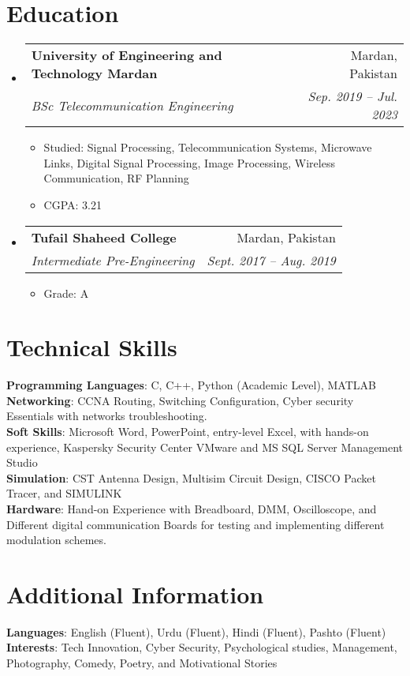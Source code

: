 \documentclass[letterpaper,11pt]{article}
\makeatletter
\newcommand{\resumeItem}[1]{
  \item\small{
    {#1 \vspace{-2pt}}
  }
}
\newcommand{\resumeSubheading}[4]{
  \vspace{-0.5pt}\item
    \begin{tabular*}{0.97\textwidth}[t]{l@{\extracolsep{\fill}}r}
      \textbf{#1} & #2 \\
      \textit{#3} & \textit{\small #4} \\
    \end{tabular*}\vspace{-7pt}
}
\newcommand{\resumeSubHeadingListStart}{\begin{itemize}[leftmargin=0.15in, label={}]}
\newcommand{\resumeSubHeadingListEnd}{\end{itemize}}
\newcommand{\resumeItemListStart}{\begin{itemize}}
\newcommand{\resumeItemListEnd}{\end{itemize}\vspace{-7pt}}
\makeatother
\begin{document}
\section{Education}
  \resumeSubHeadingListStart
    \resumeSubheading
      {University of Engineering and Technology Mardan}{Mardan, Pakistan}
      {BSc Telecommunication Engineering}{Sep. 2019 -- Jul. 2023}
      \resumeItemListStart
        \resumeItem{Studied: Signal Processing, Telecommunication Systems, Microwave Links, Digital Signal Processing, Image Processing, Wireless Communication, RF Planning}
        \resumeItem{CGPA: 3.21}
      \resumeItemListEnd
    \resumeSubHeadingListEnd

  \resumeSubHeadingListStart
    \resumeSubheading
      {Tufail Shaheed College}{Mardan, Pakistan}
      {Intermediate Pre-Engineering}{Sept. 2017 -- Aug. 2019}
      \resumeItemListStart
        \resumeItem{Grade: A}
      \resumeItemListEnd
    \resumeSubHeadingListEnd

\section{Technical Skills}
  \begin{itemize}[leftmargin=0.15in, label={}]
    \small{\item{
      \textbf{Programming Languages}{: C, C++, Python (Academic Level), MATLAB} \\
      \textbf{Networking}: CCNA Routing, Switching Configuration, Cyber security Essentials with networks troubleshooting. \\
      \textbf{Soft Skills}: Microsoft Word, PowerPoint, entry-level Excel, with hands-on experience, Kaspersky Security Center VMware and MS SQL Server Management Studio \\
      \textbf{Simulation}: CST Antenna Design, Multisim Circuit Design, CISCO Packet Tracer, and SIMULINK \\
      \textbf{Hardware}: Hand-on Experience with Breadboard, DMM, Oscilloscope, and Different digital communication Boards for testing and implementing different modulation schemes.
    }}
  \end{itemize}

\section{Additional Information}
  \begin{itemize}[leftmargin=0.15in, label={}]
    \small{\item{
      \textbf{Languages}: English (Fluent), Urdu (Fluent), Hindi (Fluent), Pashto (Fluent) \\
      \textbf{Interests}: Tech Innovation, Cyber Security, Psychological studies, Management, Photography, Comedy, Poetry, and Motivational Stories \\
    }}
  \end{itemize}
\end{document}
